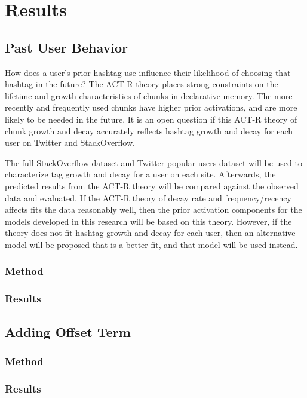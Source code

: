 \documentclass[man,floatsintext,donotrepeattitle]{apa6}
\begin{document}

\section{Results}

\subsection{Past User Behavior}

How does a user's prior hashtag use influence their likelihood of choosing that hashtag in the future?
The ACT-R theory places strong constraints on the lifetime and growth characteristics of chunks in declarative memory.
The more recently and frequently used chunks have higher prior activations, and are more likely to be needed in the future.
It is an open question if this ACT-R theory of chunk growth and decay accurately reflects hashtag growth and decay for each user on Twitter and StackOverflow.

The full StackOverflow dataset and Twitter popular-users dataset will be used to characterize tag growth and decay for a user on each site.
Afterwards, the predicted results from the ACT-R theory will be compared against the observed data and evaluated.
If the ACT-R theory of decay rate and frequency/recency affects fits the data reasonably well, then the prior activation components for the models developed in this research will be based on this theory.
However, if the theory does not fit hashtag growth and decay for each user, then an alternative model will be proposed that is a better fit, and that model will be used instead.

\subsubsection{Method}
\subsubsection{Results}

\subsection{Adding Offset Term}

\subsubsection{Method}
\subsubsection{Results}
\end{document}
